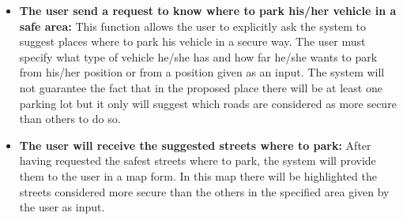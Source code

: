 \documentclass[titlepage]{article}
\begin{document}
\begin{itemize}
	\item \textbf{The user send a request to know where to park his/her vehicle in a safe area:}
	This function allows the user to explicitly ask the system to suggest places where to park his vehicle in a secure way. 
The user must specify what type of vehicle he/she has and how far he/she wants to park from his/her position or from a position given as an input. The system will not guarantee the fact that in the proposed place there will be at least one parking lot but it only will suggest which roads are considered as more secure than others to do so.
	\item \textbf{The user will receive the suggested streets where to park:}
	After having requested the safest streets where to park, the system will provide them to the user in a map form. In this map there will be highlighted the streets considered more secure than the others in the specified area given by the user as input.

\end{itemize}
\end{document}
